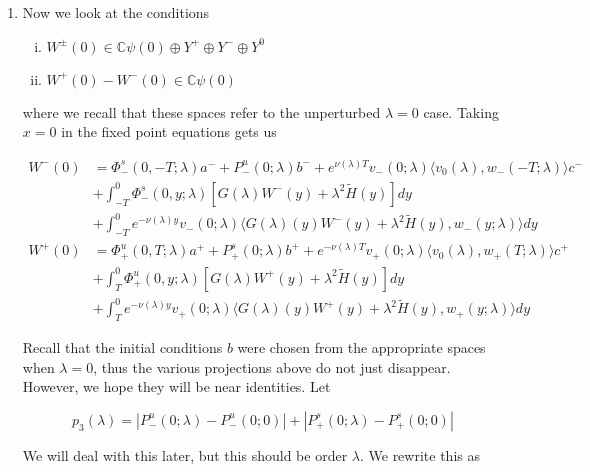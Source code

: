 \documentclass[12pt]{article}
\def\C{{\mathbb C}}
\begin{document}
\begin{enumerate}
\item Now we look at the conditions

\begin{enumerate}[(i)]
\item $W^\pm(0) \in \C \psi(0) \oplus Y^+ \oplus Y^- \oplus Y^0$
\item $W^+(0) - W^-(0) \in \C \psi(0)$ 
\end{enumerate}

where we recall that these spaces refer to the unperturbed $\lambda = 0$ case. Taking $x = 0$ in the fixed point equations gets us

\begin{align*}
W^-(0) &= \Phi^s_-(0, -T; \lambda)a^- + P^u_-(0; \lambda)b^- + e^{\nu(\lambda)T} v_-(0; \lambda) \langle v_0(\lambda), w_-(-T; \lambda) \rangle c^- \\
&+ \int_{-T}^0 \Phi^s_-(0, y; \lambda) [ G(\lambda)W^-(y) + \lambda^2 \tilde{H}(y) ] dy \\
&+ \int_{-T}^0 
e^{-\nu(\lambda)y} v_-(0; \lambda) \langle G(\lambda)(y)W^-(y) + \lambda^2 \tilde{H}(y), w_-(y; \lambda) \rangle dy \\
W^+(0) &= \Phi^u_+(0, T; \lambda)a^+ + P^s_+(0; \lambda)b^+ + e^{-\nu(\lambda)T} v_+(0; \lambda) \langle v_0(\lambda), w_+(T; \lambda) \rangle c^+ \\
&+ \int_T^0 \Phi^u_+(0, y; \lambda) [ G(\lambda)W^+(y) + \lambda^2 \tilde{H}(y) ] dy \\
&+ \int_T^0 e^{-\nu(\lambda)y} v_+(0; \lambda) \langle G(\lambda)(y)W^+(y) + \lambda^2 \tilde{H}(y), w_+(y; \lambda) \rangle dy
\end{align*}

Recall that the initial conditions $b$ were chosen from the appropriate spaces when $\lambda = 0$, thus the various projections above do not just disappear. However, we hope they will be near identities. Let

\[
p_3(\lambda) = |P^u_-(0;\lambda) - P^u_-(0; 0)| + |P^s_+(0;\lambda) - P^s_+(0;0)|
\]

We will deal with this later, but this should be order $\lambda$. We rewrite this as


\end{enumerate}
\end{document}
